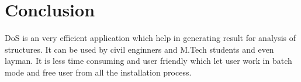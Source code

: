 \section{Conclusion}
DoS is an very efficient application which help in generating result for analysis of structures. It
can be used by civil enginners and M.Tech students and even layman. It is less time consuming and user friendly which let user work in batch mode 
and free user from all the installation process.
